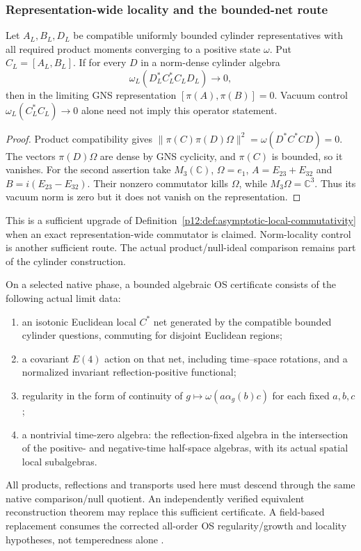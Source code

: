 \documentclass[12pt,a4paper]{article}
\begin{document}
\subsubsection{Representation-wide locality and the bounded-net route}
\begin{lemma}
\label{p12:lem:v2210-lit-locality-sandwich}
Let $A_L,B_L,D_L$ be compatible uniformly bounded cylinder representatives
with all required product moments converging to a positive state $\omega$.
Put $C_L=[A_L,B_L]$. If for every $D$ in a norm-dense cylinder algebra
\[
 \omega_L(D_L^*C_L^*C_LD_L)\longrightarrow0,
\]
then in the limiting GNS representation
$[\pi(A),\pi(B)]=0$. Vacuum control
$\omega_L(C_L^*C_L)\to0$ alone need not imply this operator statement.
\end{lemma}
\begin{proof}
Product compatibility gives
$\|\pi(C)\pi(D)\Omega\|^2=\omega(D^*C^*CD)=0$.
The vectors $\pi(D)\Omega$ are dense by GNS cyclicity, and $\pi(C)$ is
bounded, so it vanishes. For the second assertion take $M_3(\mathbb C)$,
$\Omega=e_1$, $A=E_{23}+E_{32}$ and $B=i(E_{23}-E_{32})$.
Their nonzero commutator kills $\Omega$, while $M_3\Omega=\mathbb C^3$.
Thus its vacuum norm is zero but it does not vanish on the representation.
\end{proof}
This is a sufficient upgrade of Definition~\ref{p12:def:asymptotic-local-commutativity}
when an exact representation-wide commutator is claimed. Norm-locality
control is another sufficient route. The actual product/null-ideal
comparison remains part of the cylinder construction.

\begin{definition}
\label{p12:def:v2210-lit-bounded-os-certificate}
On a selected native phase, a bounded algebraic OS certificate consists of
the following actual limit data:
\begin{enumerate}
\item an isotonic Euclidean local $C^*$ net generated by the compatible
bounded cylinder questions, commuting for disjoint Euclidean regions;
\item a covariant $E(4)$ action on that net, including time--space rotations,
and a normalized invariant reflection-positive functional;
\item regularity in the form of continuity of
$g\mapsto\omega(a\alpha_g(b)c)$ for each fixed $a,b,c$;
\item a nontrivial time-zero algebra: the reflection-fixed algebra in the
intersection of the positive- and negative-time half-space algebras,
with its actual spatial local subalgebras.
\end{enumerate}
All products, reflections and transports used here must descend through
the same native comparison/null quotient. An independently verified
equivalent reconstruction theorem may replace this sufficient certificate.
A field-based replacement consumes the corrected all-order OS
regularity/growth and locality hypotheses, not temperedness alone
\cite{OsterwalderSchrader1973,OsterwalderSchrader1975}.
\end{definition}
\end{document}
